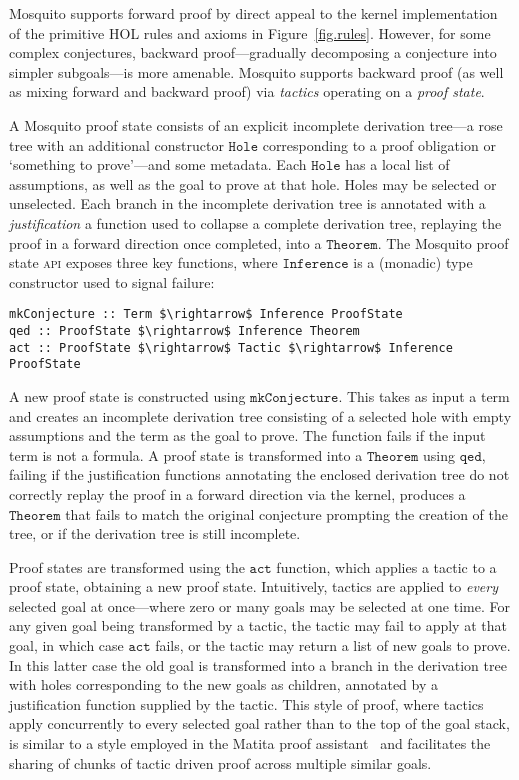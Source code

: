 \documentclass{llncs}
\newcommand{\mosquito}{Mosquito\xspace}
\begin{document}
\mosquito supports forward proof by direct appeal to the kernel implementation of the primitive HOL rules and axioms in Figure~\ref{fig.rules}.
However, for some complex conjectures, backward proof---gradually decomposing a conjecture into simpler subgoals---is more amenable.
\mosquito supports backward proof (as well as mixing forward and backward proof) via \emph{tactics} operating on a \emph{proof state}.

A \mosquito proof state consists of an explicit incomplete derivation tree---a rose tree with an additional constructor $\mathtt{Hole}$ corresponding to a proof obligation or `something to prove'---and some metadata.
Each $\mathtt{Hole}$ has a local list of assumptions, as well as the goal to prove at that hole.
Holes may be selected or unselected.
Each branch in the incomplete derivation tree is annotated with a \emph{justification} a function used to collapse a complete derivation tree, replaying the proof in a forward direction once completed, into a $\mathtt{Theorem}$.
The \mosquito proof state \textsc{api} exposes three key functions, where $\mathtt{Inference}$ is a (monadic) type constructor used to signal failure:
\begin{lstlisting}
mkConjecture :: Term $\rightarrow$ Inference ProofState
qed :: ProofState $\rightarrow$ Inference Theorem
act :: ProofState $\rightarrow$ Tactic $\rightarrow$ Inference ProofState
\end{lstlisting}

A new proof state is constructed using $\mathtt{mkConjecture}$.
This takes as input a term and creates an incomplete derivation tree consisting of a selected hole with empty assumptions and the term as the goal to prove.
The function fails if the input term is not a formula.
A proof state is transformed into a $\mathtt{Theorem}$ using $\mathtt{qed}$, failing if the justification functions annotating the enclosed derivation tree do not correctly replay the proof in a forward direction via the kernel, produces a $\mathtt{Theorem}$ that fails to match the original conjecture prompting the creation of the tree, or if the derivation tree is still incomplete.

Proof states are transformed using the $\mathtt{act}$ function, which applies a tactic to a proof state, obtaining a new proof state.
Intuitively, tactics are applied to \emph{every} selected goal at once---where zero or many goals may be selected at one time.
For any given goal being transformed by a tactic, the tactic may fail to apply at that goal, in which case $\mathtt{act}$ fails, or the tactic may return a list of new goals to prove.
In this latter case the old goal is transformed into a branch in the derivation tree with holes corresponding to the new goals as children, annotated by a justification function supplied by the tactic.
This style of proof, where tactics apply concurrently to every selected goal rather than to the top of the goal stack, is similar to a style employed in the Matita proof assistant~\cite{asperti:matita:2011} and facilitates the sharing of chunks of tactic driven proof across multiple similar goals.
\end{document}
